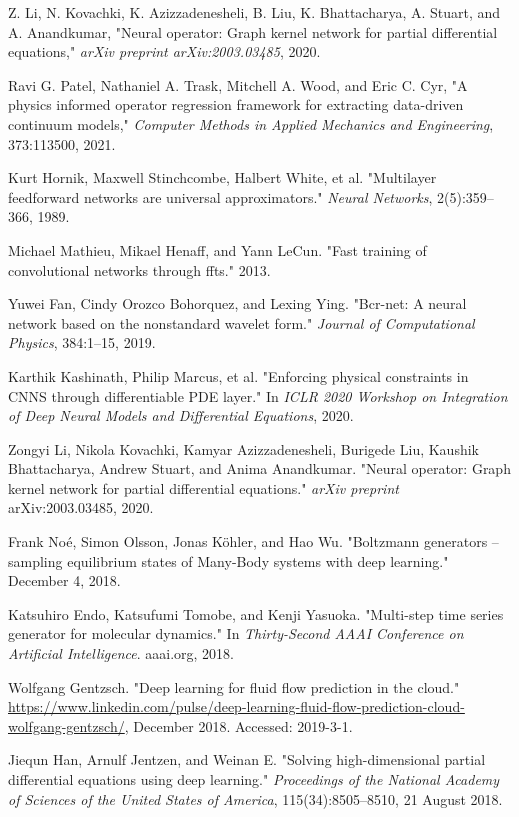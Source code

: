 \documentclass[conference]{IEEEtran}
\begin{document}
\begin{thebibliography}{00}
 Z. Li, N. Kovachki, K. Azizzadenesheli, B. Liu, K. Bhattacharya, A. Stuart, and A. Anandkumar, "Neural operator: Graph kernel network for partial differential equations," \textit{arXiv preprint arXiv:2003.03485}, 2020.

 Ravi G. Patel, Nathaniel A. Trask, Mitchell A. Wood, and Eric C. Cyr, "A physics informed operator regression framework for extracting data-driven continuum models," \textit{Computer Methods in Applied Mechanics and Engineering}, 373:113500, 2021.

 Kurt Hornik, Maxwell Stinchcombe, Halbert White, et al. "Multilayer feedforward networks are universal approximators." \textit{Neural Networks}, 2(5):359–366, 1989.

 Michael Mathieu, Mikael Henaff, and Yann LeCun. "Fast training of convolutional networks through ffts." 2013.

 Yuwei Fan, Cindy Orozco Bohorquez, and Lexing Ying. "Bcr-net: A neural network based on the nonstandard wavelet form." \textit{Journal of Computational Physics}, 384:1–15, 2019.

 Karthik Kashinath, Philip Marcus, et al. "Enforcing physical constraints in CNNS through differentiable PDE layer." In \textit{ICLR 2020 Workshop on Integration of Deep Neural Models and Differential Equations}, 2020.

 Zongyi Li, Nikola Kovachki, Kamyar Azizzadenesheli, Burigede Liu, Kaushik Bhattacharya, Andrew Stuart, and Anima Anandkumar. "Neural operator: Graph kernel network for partial differential equations." \textit{arXiv preprint} arXiv:2003.03485, 2020.

 Frank No\'{e}, Simon Olsson, Jonas K\"{o}hler, and Hao Wu. "Boltzmann generators – sampling equilibrium states of Many-Body systems with deep learning." December 4, 2018.

 Katsuhiro Endo, Katsufumi Tomobe, and Kenji Yasuoka. "Multi-step time series generator for molecular dynamics." In \textit{Thirty-Second AAAI Conference on Artificial Intelligence}. aaai.org, 2018.

 Wolfgang Gentzsch. "Deep learning for fluid flow prediction in the cloud." \url{https://www.linkedin.com/pulse/deep-learning-fluid-flow-prediction-cloud-wolfgang-gentzsch/}, December 2018. Accessed: 2019-3-1.

 Jiequn Han, Arnulf Jentzen, and Weinan E. "Solving high-dimensional partial differential equations using deep learning." \textit{Proceedings of the National Academy of Sciences of the United States of America}, 115(34):8505–8510, 21 August 2018.


\end{thebibliography}
\end{document}
